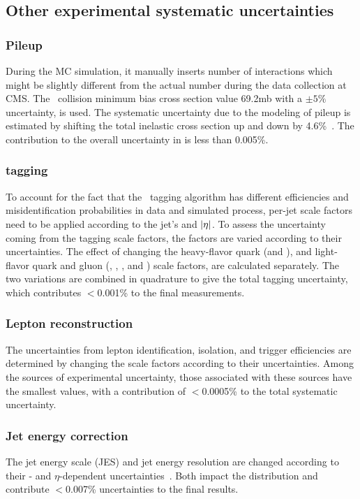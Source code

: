 \subsection{Other experimental systematic uncertainties}
\subsubsection{Pileup}
During the MC simulation, it manually inserts number of interactions which might be slightly different from the actual number during the data collection at CMS.
The \Pp\Pp~collision minimum bias cross section value 69.2\unit{mb} with a $\pm5\%$ uncertainty, is used.
The systematic uncertainty due to the modeling of pileup is estimated by shifting the total inelastic cross section up and down by 4.6\%~\cite{Sim:pileup}.
The contribution to the overall uncertainty in \Acpprime is less than 0.005\%.

\subsubsection{\texorpdfstring{\PQb}{} tagging}
To account for the fact that the \PQb~tagging algorithm has different efficiencies and misidentification probabilities in data and simulated process, per-jet scale factors need to be applied according to the jet's \PT and $\lvert \eta \rvert$.
To assess the uncertainty coming from the \PQb tagging scale factors, the factors are varied according to their uncertainties.
The effect of changing the heavy-flavor quark (\PQb and \PQc), and light-flavor quark and gluon (\PQu, \PQd, \PQs, and \Pg) scale factors, are calculated separately.
The two variations are combined in quadrature to give the total \PQb tagging uncertainty, which contributes $<$0.001\% to the final \Acpprime measurements.

\subsubsection{Lepton reconstruction}
The uncertainties from lepton identification, isolation, and trigger efficiencies are determined by changing the scale factors according to their uncertainties.
Among the sources of experimental uncertainty, those associated with these sources have the smallest values, with a contribution of $<$0.0005\% to the total systematic uncertainty.

\subsubsection{Jet energy correction}
The jet energy scale (JES) and jet energy resolution are changed according to their {\PT}- and $\eta$-dependent uncertainties~\cite{CMS:2016lmd}.
Both impact the \Mlb distribution and contribute $<$0.007\% uncertainties to the final results.

